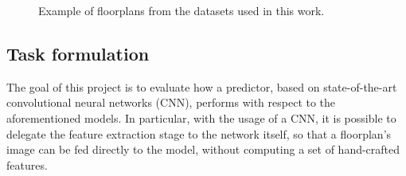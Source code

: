 \begin{figure}[ht!]
    \centering
        \hspace{.3in}
        \hspace{.3in}
    \caption{Example of floorplans from the datasets used in this work.}\label{fig:maxExample}
\end{figure}


\subsection{Task formulation} %
The goal of this project is to evaluate how a predictor, based on state-of-the-art convolutional neural networks (CNN), performs with respect to the aforementioned models. In particular, with the usage of a CNN, it is possible to delegate the feature extraction stage to the network itself, so that a floorplan's image can be fed directly to the model, without computing a set of hand-crafted features.  



